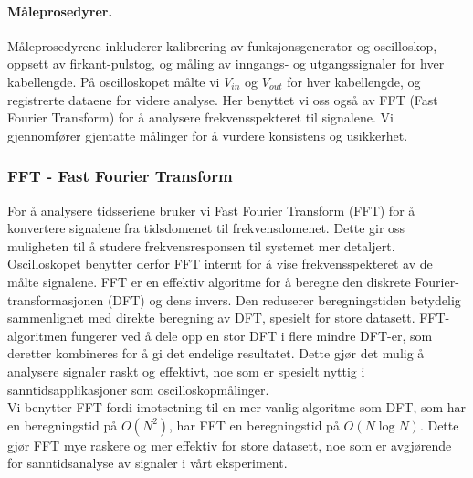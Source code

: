\paragraph{Måleprosedyrer.}
Måleprosedyrene inkluderer kalibrering av funksjonsgenerator og oscilloskop, oppsett av firkant-pulstog, og måling av inngangs- og utgangssignaler for hver kabellengde. På oscilloskopet målte vi $V_{in}$ og $V_{out}$ for hver kabellengde, og registrerte dataene for videre analyse. Her benyttet vi oss også av FFT (Fast Fourier Transform) for å analysere frekvensspekteret til signalene. Vi gjennomfører gjentatte målinger for å vurdere konsistens og usikkerhet.

\subsubsection{FFT - Fast Fourier Transform}
For å analysere tidsseriene bruker vi Fast Fourier Transform (FFT) for å konvertere signalene fra tidsdomenet til frekvensdomenet. Dette gir oss muligheten til å studere frekvensresponsen til systemet mer detaljert. Oscilloskopet benytter derfor FFT internt for å vise frekvensspekteret av de målte signalene.
FFT er en effektiv algoritme for å beregne den diskrete Fourier-transformasjonen (DFT) og dens invers. Den reduserer beregningstiden betydelig sammenlignet med direkte beregning av DFT, spesielt for store datasett. FFT-algoritmen fungerer ved å dele opp en stor DFT i flere mindre DFT-er, som deretter kombineres for å gi det endelige resultatet. Dette gjør det mulig å analysere signaler raskt og effektivt, noe som er spesielt nyttig i sanntidsapplikasjoner som oscilloskopmålinger. \\ Vi benytter FFT fordi imotsetning til en mer vanlig algoritme som DFT, som har en beregningstid på $O(N^2)$, har FFT en beregningstid på $O(N \log N)$. Dette gjør FFT mye raskere og mer effektiv for store datasett, noe som er avgjørende for sanntidsanalyse av signaler i vårt eksperiment.